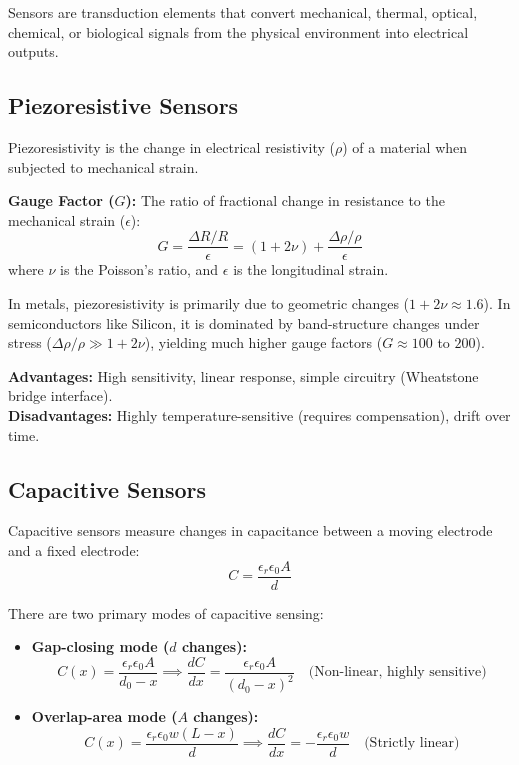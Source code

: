 \documentclass[12pt,a4paper]{article}
\begin{document}
Sensors are transduction elements that convert mechanical, thermal, optical, chemical, or biological signals from the physical environment into electrical outputs.

\subsection{Piezoresistive Sensors}
Piezoresistivity is the change in electrical resistivity ($\rho$) of a material when subjected to mechanical strain.
\begin{tcolorbox}[defbox]
\textbf{Gauge Factor ($G$):} The ratio of fractional change in resistance to the mechanical strain ($\epsilon$):
$$G = \frac{\Delta R / R}{\epsilon} = (1 + 2\nu) + \frac{\Delta\rho/\rho}{\epsilon}$$
where $\nu$ is the Poisson's ratio, and $\epsilon$ is the longitudinal strain.
\end{tcolorbox}
In metals, piezoresistivity is primarily due to geometric changes ($1+2\nu \approx 1.6$). In semiconductors like Silicon, it is dominated by band-structure changes under stress ($\Delta\rho/\rho \gg 1+2\nu$), yielding much higher gauge factors ($G \approx 100$ to $200$).

\textbf{Advantages:} High sensitivity, linear response, simple circuitry (Wheatstone bridge interface). \\
\textbf{Disadvantages:} Highly temperature-sensitive (requires compensation), drift over time.

\subsection{Capacitive Sensors}
Capacitive sensors measure changes in capacitance between a moving electrode and a fixed electrode:
$$C = \frac{\epsilon_r \epsilon_0 A}{d}$$

There are two primary modes of capacitive sensing:
\begin{itemize}[leftmargin=*, itemsep=4pt]
  \item \textbf{Gap-closing mode ($d$ changes):}
  $$C(x) = \frac{\epsilon_r \epsilon_0 A}{d_0 - x} \implies \frac{dC}{dx} = \frac{\epsilon_r \epsilon_0 A}{(d_0 - x)^2} \quad \text{(Non-linear, highly sensitive)}$$
  \item \textbf{Overlap-area mode ($A$ changes):}
  $$C(x) = \frac{\epsilon_r \epsilon_0 w (L - x)}{d} \implies \frac{dC}{dx} = -\frac{\epsilon_r \epsilon_0 w}{d} \quad \text{(Strictly linear)}$$
\end{itemize}
\end{document}
